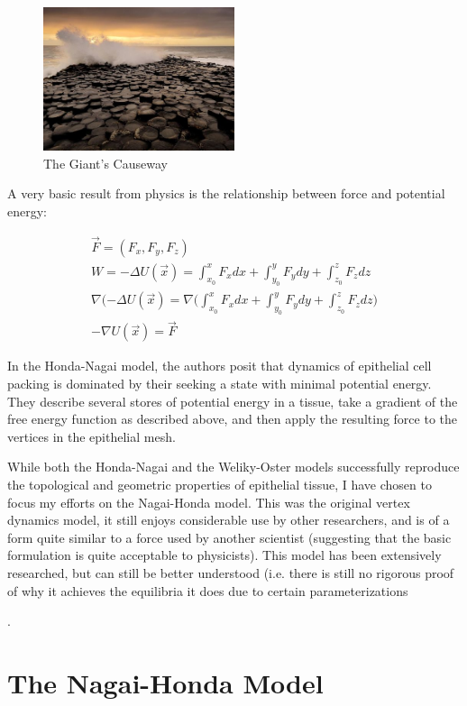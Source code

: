 {\begin{figure}[h]
\centering
\includegraphics[width=0.5\textwidth]{../diagrams/resize_giant.jpg}
\caption{The Giant's Causeway}
\label{fig:cause}
\end{figure}

A very basic result from physics is the relationship between force and potential energy:

\begin{gather}
\vec{F} = (F_x, F_y, F_z)\\
W = -\Delta U(\vec{x}) = \int_{x_0}^xF_xdx+\int_{y_0}^yF_ydy+\int_{z_0}^zF_zdz\\
\nabla(-\Delta U(\vec{x}) = \nabla\Bigg(\int_{x_0}^xF_xdx+\int_{y_0}^yF_ydy+\int_{z_0}^zF_zdz\Bigg)\\
-\nabla U(\vec{x}) = \vec{F}
\end{gather}

In the Honda-Nagai model, the authors posit that dynamics of epithelial cell packing is dominated by their seeking a state with minimal potential energy. They describe several stores of potential energy in a tissue, take a gradient of the free energy function as described above, and then apply the resulting force to the vertices in the epithelial mesh.

While both the Honda-Nagai and the Weliky-Oster models successfully reproduce the topological and geometric properties of epithelial tissue, I have chosen to focus my efforts on the Nagai-Honda model. This was the original vertex dynamics model, it still enjoys considerable use by other researchers, and is of a form quite similar to a force used by another scientist\cite{Farhadifar} (suggesting that the basic formulation is quite acceptable to physicists). This model has been extensively researched, but can still be better understood (i.e. there is still no rigorous proof of why it achieves the equilibria it does due to certain parameterizations}.

\section{The Nagai-Honda Model}
